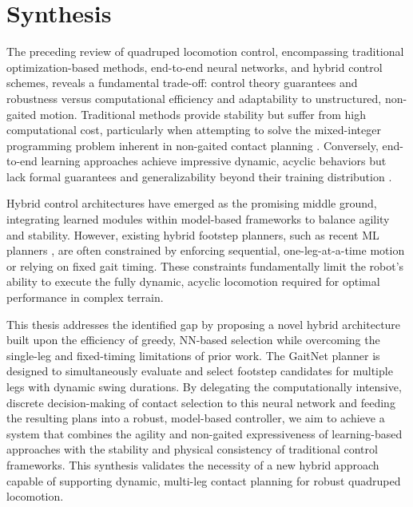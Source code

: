 \section{Synthesis}
\label{sec:background-synthesis}

The preceding review of quadruped locomotion control, encompassing
traditional optimization-based methods, end-to-end neural networks,
and hybrid control schemes, reveals a fundamental trade-off: control
theory guarantees and robustness versus computational efficiency and
adaptability to unstructured, non-gaited motion. Traditional methods
provide stability but suffer from high computational cost,
particularly when attempting to solve the mixed-integer programming
problem inherent in non-gaited contact planning
\cite{winkler_gait_2018, taouil_non-gaited_2024}. Conversely,
end-to-end learning approaches achieve impressive dynamic, acyclic
behaviors but lack formal guarantees and generalizability beyond
their training distribution \cite{zhang_learning_2023}.

Hybrid control architectures have emerged as the promising middle
ground, integrating learned modules within model-based frameworks to
balance agility and stability. However, existing hybrid footstep
planners, such as recent ML planners \cite{bratta_contactnet_2024}, are often
constrained by enforcing sequential, one-leg-at-a-time motion or
relying on fixed gait timing. These constraints fundamentally limit
the robot's ability to execute the fully dynamic, acyclic locomotion
required for optimal performance in complex terrain.

This thesis addresses the identified gap by proposing a novel hybrid
architecture built upon the efficiency of greedy, NN-based selection
while overcoming the single-leg and fixed-timing limitations of prior
work. The GaitNet planner is designed to simultaneously
evaluate and select footstep candidates for multiple legs with
dynamic swing durations. By delegating the computationally intensive,
discrete decision-making of contact selection to this neural network
and feeding the resulting plans into a robust, model-based
controller, we aim to achieve a system that combines the agility and
non-gaited expressiveness of learning-based approaches with the
stability and physical consistency of traditional control frameworks.
This synthesis validates the necessity of a new hybrid approach
capable of supporting dynamic, multi-leg contact planning for robust
quadruped locomotion.
